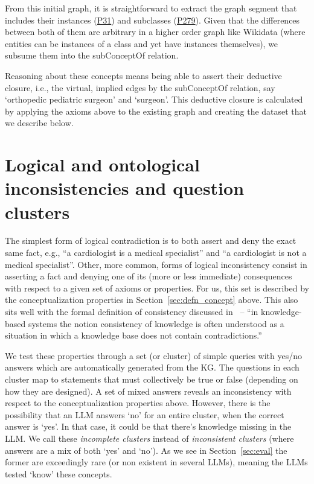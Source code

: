 \documentclass{article} %
\begin{document}
From this initial graph, it is straightforward to extract the graph segment that includes their instances (\href{https://www.wikidata.org/wiki/Property:P31}{P31}) and subclasses (\href{https://www.wikidata.org/wiki/Property:P279}{P279}). Given that the differences between both of them are arbitrary in a higher order graph like Wikidata (where entities can be instances of a class and yet have instances themselves), we subsume them into the subConceptOf relation.

Reasoning about these concepts means being able to assert their deductive closure, i.e., the virtual, implied edges by the subConceptOf relation, say `orthopedic pediatric surgeon' and `surgeon'. This deductive closure is calculated by applying the axioms above to the existing graph and creating the dataset that we describe below.  

\section{Logical and ontological inconsistencies and question clusters}
\label{sec:logical_onto_inconsistencies}

The simplest form of logical contradiction is to both assert and deny the exact same fact, e.g., ``a cardiologist is a medical specialist'' and ``a cardiologist is not a medical specialist''. Other, more common, forms of logical inconsistency consist in asserting a fact and denying one of its (more or less immediate) consequences with respect to a given set of axioms or properties. For us, this set is described by the conceptualization properties in Section~\ref{sec:defn_concept} above. This also sits well with the formal definition of consistency discussed in~\cite{InconsistentKnowledge} -- ``in knowledge-based systems the notion consistency of knowledge is often understood as a situation in which a knowledge base does not contain contradictions.'' 

We test these properties through a set (or cluster) of simple queries with yes/no answers which are automatically generated from the KG. The questions in each cluster map to statements that must collectively be true or false (depending on how they are designed). A set of mixed answers reveals an inconsistency with respect to the conceptualization properties above. However, there is the possibility that an LLM answers `no' for an entire cluster, when the correct answer is `yes'. In that case, it could be that there's knowledge missing in the LLM. We call these {\em incomplete clusters} instead of {\em inconsistent clusters} (where answers are a mix of both `yes' and `no'). As we see in Section~\ref{sec:eval} the former are exceedingly rare (or non existent in several LLMs), meaning the LLMs tested `know' these concepts. 
\end{document}
